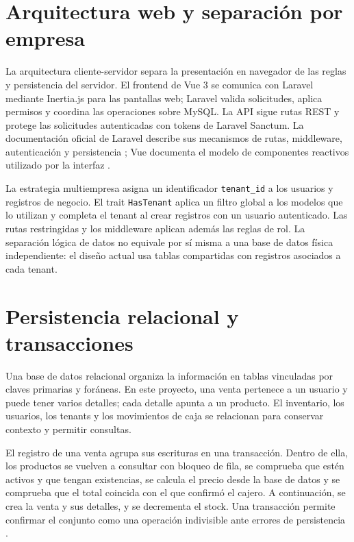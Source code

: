 \section{Arquitectura web y separación por empresa}

La arquitectura cliente-servidor separa la presentación en navegador de las reglas y persistencia del servidor. El frontend de Vue 3 se comunica con Laravel mediante Inertia.js para las pantallas web; Laravel valida solicitudes, aplica permisos y coordina las operaciones sobre MySQL. La API sigue rutas REST y protege las solicitudes autenticadas con tokens de Laravel Sanctum. La documentación oficial de Laravel describe sus mecanismos de rutas, middleware, autenticación y persistencia \cite{laravel12,sanctum}; Vue documenta el modelo de componentes reactivos utilizado por la interfaz \cite{vue3}.

La estrategia multiempresa asigna un identificador \texttt{tenant\_id} a los usuarios y registros de negocio. El trait \texttt{HasTenant} aplica un filtro global a los modelos que lo utilizan y completa el tenant al crear registros con un usuario autenticado. Las rutas restringidas y los middleware aplican además las reglas de rol. La separación lógica de datos no equivale por sí misma a una base de datos física independiente: el diseño actual usa tablas compartidas con registros asociados a cada tenant.

\section{Persistencia relacional y transacciones}

Una base de datos relacional organiza la información en tablas vinculadas por claves primarias y foráneas. En este proyecto, una venta pertenece a un usuario y puede tener varios detalles; cada detalle apunta a un producto. El inventario, los usuarios, los tenants y los movimientos de caja se relacionan para conservar contexto y permitir consultas.

El registro de una venta agrupa sus escrituras en una transacción. Dentro de ella, los productos se vuelven a consultar con bloqueo de fila, se comprueba que estén activos y que tengan existencias, se calcula el precio desde la base de datos y se comprueba que el total coincida con el que confirmó el cajero. A continuación, se crea la venta y sus detalles, y se decrementa el stock. Una transacción permite confirmar el conjunto como una operación indivisible ante errores de persistencia \cite{mysqltransactions}.

